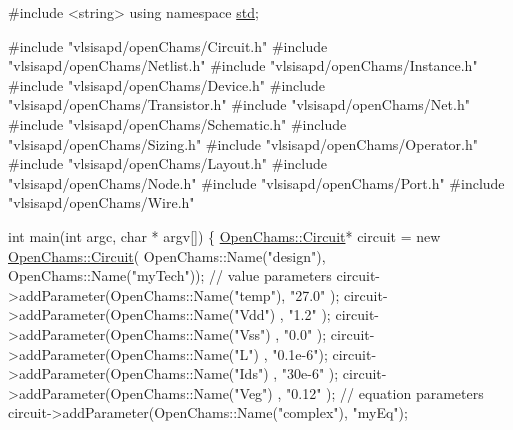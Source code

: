 \begin{DoxyCodeInclude}
\textcolor{preprocessor}{#include <string>}
\textcolor{keyword}{using namespace }\hyperlink{namespacestd}{std};

\textcolor{preprocessor}{#include "vlsisapd/openChams/Circuit.h"}
\textcolor{preprocessor}{#include "vlsisapd/openChams/Netlist.h"}
\textcolor{preprocessor}{#include "vlsisapd/openChams/Instance.h"}
\textcolor{preprocessor}{#include "vlsisapd/openChams/Device.h"}
\textcolor{preprocessor}{#include "vlsisapd/openChams/Transistor.h"}
\textcolor{preprocessor}{#include "vlsisapd/openChams/Net.h"}
\textcolor{preprocessor}{#include "vlsisapd/openChams/Schematic.h"}
\textcolor{preprocessor}{#include "vlsisapd/openChams/Sizing.h"}
\textcolor{preprocessor}{#include "vlsisapd/openChams/Operator.h"}
\textcolor{preprocessor}{#include "vlsisapd/openChams/Layout.h"}
\textcolor{preprocessor}{#include "vlsisapd/openChams/Node.h"}
\textcolor{preprocessor}{#include "vlsisapd/openChams/Port.h"}
\textcolor{preprocessor}{#include "vlsisapd/openChams/Wire.h"}

\textcolor{keywordtype}{int} main(\textcolor{keywordtype}{int} argc, \textcolor{keywordtype}{char} * argv[]) \{
    \hyperlink{class_open_chams_1_1_circuit}{OpenChams::Circuit}* circuit = \textcolor{keyword}{new} \hyperlink{class_open_chams_1_1_circuit}{OpenChams::Circuit}(
      OpenChams::Name(\textcolor{stringliteral}{"design"}), OpenChams::Name(\textcolor{stringliteral}{"myTech"}));
    \textcolor{comment}{// value parameters}
    circuit->addParameter(OpenChams::Name(\textcolor{stringliteral}{"temp"}), \textcolor{stringliteral}{"27.0"}  );
    circuit->addParameter(OpenChams::Name(\textcolor{stringliteral}{"Vdd"}) , \textcolor{stringliteral}{"1.2"}   );
    circuit->addParameter(OpenChams::Name(\textcolor{stringliteral}{"Vss"}) , \textcolor{stringliteral}{"0.0"}   );
    circuit->addParameter(OpenChams::Name(\textcolor{stringliteral}{"L"})   , \textcolor{stringliteral}{"0.1e-6"});
    circuit->addParameter(OpenChams::Name(\textcolor{stringliteral}{"Ids"}) , \textcolor{stringliteral}{"30e-6"} );
    circuit->addParameter(OpenChams::Name(\textcolor{stringliteral}{"Veg"}) , \textcolor{stringliteral}{"0.12"}  );
    \textcolor{comment}{// equation parameters}
    circuit->addParameter(OpenChams::Name(\textcolor{stringliteral}{"complex"}), \textcolor{stringliteral}{"myEq"});


\end{DoxyCodeInclude}

